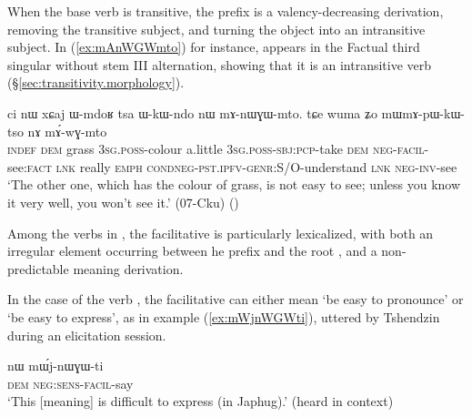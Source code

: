 When the base verb is transitive, the  prefix is a valency-decreasing derivation, removing the transitive subject, and turning the object into an intransitive subject. In (\ref{ex:mAnWGWmto}) for instance,  appears in the Factual third singular without stem III alternation, showing that it is an intransitive verb (§\ref{sec:transitivity.morphology}).

\begin{exe}
\ex \label{ex:mAnWGWmto}
\gll ci nɯ xɕaj ɯ-mdoʁ tsa ɯ-kɯ-ndo nɯ mɤ-nɯɣɯ-mto. tɕe wuma ʑo mɯ\redp{}mɤ-pɯ-kɯ-tso nɤ mɤ́-wɣ-mto \\
\textsc{indef} \textsc{dem} grass \textsc{3sg}.\textsc{poss}-colour a.little \textsc{3sg}.\textsc{poss}-\textsc{sbj}:\textsc{pcp}-take \textsc{dem} \textsc{neg}-\textsc{facil}-see:\textsc{fact} \textsc{lnk} really \textsc{emph} \textsc{cond\redp}{}\textsc{neg}-\textsc{pst}.\textsc{ipfv}-\textsc{genr}:S/O-understand \textsc{lnk} \textsc{neg}-\textsc{inv}-see \\
\glt `The other one, which has the colour of grass, is not easy to see; unless you know it very well, you won't see it.' (07-Cku) ()
\end{exe}  

Among the verbs in , the facilitative  is particularly lexicalized, with both an irregular  element occurring between he prefix  and the root , and a non-predictable meaning derivation.
 
In the case of the verb , the facilitative  can either mean `be easy to pronounce' or `be easy to express', as in example (\ref{ex:mWjnWGWti}), uttered by Tshendzin during an elicitation session.

\begin{exe}
\ex \label{ex:mWjnWGWti}
\gll  nɯ mɯ́j-nɯɣɯ-ti \\
\textsc{dem} \textsc{neg}:\textsc{sens}-\textsc{facil}-say \\
\glt `This [meaning] is difficult to express (in Japhug).' (heard in context)
\end{exe}  


